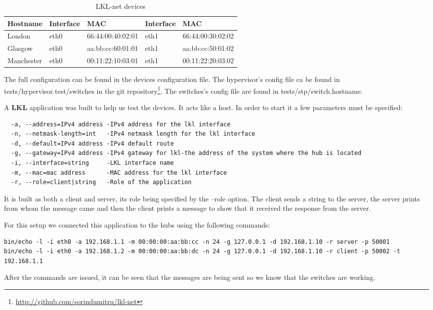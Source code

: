 \begin{center}
  \begin{table}[htb]
  \begin{center}
  \begin{tabular}{| l | l | l | l | l |}
    \hline
      Hostname & Interface & MAC & Interface & MAC \\ \hline
      London & eth0 & 66:44:00:40:02:01 & eth1 & 66:44:00:30:02:02 \\ \hline
      Glasgow & eth0 & aa:bb:cc:60:01:01 & eth1 & aa:bb:cc:50:01:02 \\ \hline
      Manchester & eth0 & 00:11:22:10:03:01 & eth1 & 00:11:22:20:03:02 \\
    \hline
  \end{tabular}
  \end{center}
  \caption{LKL-net devices}
  \label{table:tdevices}
  \end{table}
\end{center}

The full configuration can be found in the devices configuration file. The hypervisor's config file
ca be found in tests/hypervisor.test/switches in the git repository\footnote{\url{http://github.com/sorindumitru/lkl-net}}.
The switches's config file are found in tests/stp/switch.hostname.

A \textbf{LKL} application was built to help us test the devices. It acts like a host. In order to start it
a few parameters must be specified:
\begin{lstlisting}
  -a, --address=IPv4 address -IPv4 address for the lkl interface
  -n, --netmask-length=int   -IPv4 netmask length for the lkl interface
  -d, --default=IPv4 address -IPv4 default route
  -g, --gateway=IPv4 address -IPv4 gateway for lkl-the address of the system where the hub is located
  -i, --interface=string     -LKL interface name
  -m, --mac=mac address      -MAC address for the lkl interface
  -r, --role=client|string   -Role of the application
\end{lstlisting}
It is built as both a client and server, its role being specified by the --role option. The client
sends a string to the server, the server prints from whom the message came and then the client prints
a message to show that it received the response from the server.

For this setup we connected this application to the hubs using the following commands:
\begin{lstlisting}
bin/echo -l -i eth0 -a 192.168.1.1 -m 00:00:00:aa:bb:cc -n 24 -g 127.0.0.1 -d 192.168.1.10 -r server -p 50001
bin/echo -l -i eth0 -a 192.168.1.2 -m 00:00:00:aa:bb:dc -n 24 -g 127.0.0.1 -d 192.168.1.10 -r client -p 50002 -t 192.168.1.1
\end{lstlisting}
After the commands are issued, it can be seen that the messages are being sent so we know that the switches are working.

